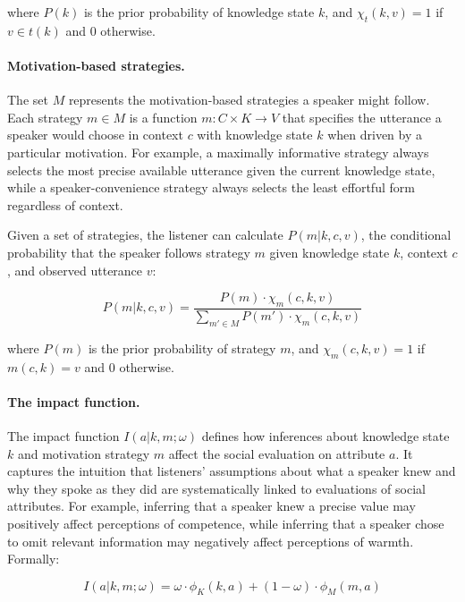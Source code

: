 \documentclass[12pt,a4paper]{article}
\begin{document}
\noindent where $P(k)$ is the prior probability of knowledge state $k$, and
$\chi_t(k,v) = 1$ if $v \in t(k)$ and $0$ otherwise.

\paragraph{Motivation-based strategies.}
The set $M$ represents the motivation-based strategies a speaker might follow.
Each strategy $m \in M$ is a function $m: C \times K \rightarrow V$ that
specifies the utterance a speaker would choose in context $c$ with knowledge
state $k$ when driven by a particular motivation. For example, a maximally
informative strategy always selects the most precise available utterance given
the current knowledge state, while a speaker-convenience strategy always selects
the least effortful form regardless of context.

Given a set of strategies, the listener can calculate $P(m|k,c,v)$, the
conditional probability that the speaker follows strategy $m$ given knowledge
state $k$, context $c$, and observed utterance $v$:

\begin{equation}
P(m|k,c,v) = \frac{P(m) \cdot \chi_m(c,k,v)}
                  {\sum_{m' \in M} P(m') \cdot \chi_m(c,k,v)}
\label{eq3}
\end{equation}

\noindent where $P(m)$ is the prior probability of strategy $m$, and
$\chi_m(c,k,v) = 1$ if $m(c,k) = v$ and $0$ otherwise.

\paragraph{The impact function.}
The impact function $I(a|k,m;\omega)$ defines how inferences about knowledge
state $k$ and motivation strategy $m$ affect the social evaluation on attribute
$a$. It captures the intuition that listeners' assumptions about what a speaker
knew and why they spoke as they did are systematically linked to evaluations of
social attributes. For example, inferring that a speaker knew a precise value
may positively affect perceptions of competence, while inferring that a speaker
chose to omit relevant information may negatively affect perceptions of warmth.
Formally:

\begin{equation}
I(a|k,m;\omega) = \omega \cdot \phi_K(k,a) + (1-\omega) \cdot \phi_M(m,a)
\label{eq4}
\end{equation}
\end{document}
